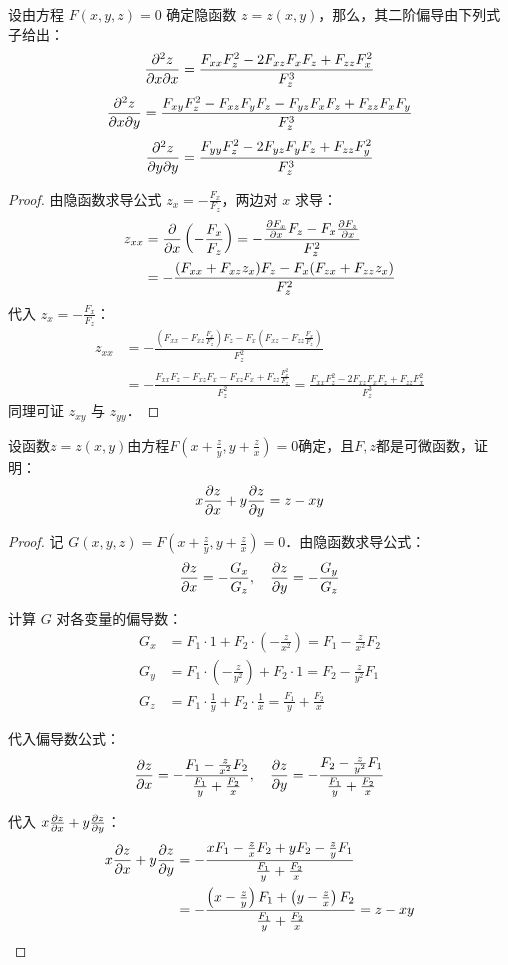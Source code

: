 \documentclass[12pt, a4paper, oneside, UTF8]{ctexbook}
\begin{document}
\begin{theorem}[二元隐函数的二阶导数]
    设由方程 $F(x, y, z) = 0$ 确定隐函数 $z = z(x, y)$，那么，其二阶偏导由下列式子给出：
    \[\pdv{z}{x}{x}=\frac{F_{xx}F_z^2-2F_{xz}F_xF_z+F_{zz}F_x^2}{F_z^3}\]
    \[\pdv{z}{x}{y}=\frac{F_{xy}F_z^2-F_{xz}F_yF_z-F_{yz}F_xF_z+F_{zz}F_xF_y}{F_z^3}\]
    \[\pdv{z}{y}{y}=\frac{F_{yy}F_z^2-2F_{yz}F_yF_z+F_{zz}F_y^2}{F_z^3}\]
\end{theorem}
\begin{proof}
    由隐函数求导公式 $z_x = -\frac{F_x}{F_z}$，两边对 $x$ 求导：
    \begin{align*}
        z_{xx} &= \pdv{x} \left( -\frac{F_x}{F_z} \right) = -\frac{\pdv{F_x}{x} F_z - F_x \pdv{F_z}{x}}{F_z^2} \\
        &= -\frac{(F_{xx} + F_{xz} z_x) F_z - F_x (F_{zx} + F_{zz} z_x)}{F_z^2}
    \end{align*}
    代入 $z_x = -\frac{F_x}{F_z}$：
    \begin{align*}
        z_{xx} &= -\frac{\left( F_{xx} - F_{xz} \frac{F_x}{F_z} \right) F_z - F_x \left( F_{xz} - F_{zz} \frac{F_x}{F_z} \right)}{F_z^2} \\
        &= -\frac{F_{xx} F_z - F_{xz} F_x - F_{xz} F_x + F_{zz} \frac{F_x^2}{F_z}}{F_z^2} = \frac{F_{xx} F_z^2 - 2F_{xz} F_x F_z + F_{zz} F_x^2}{F_z^3}
    \end{align*}
    同理可证 $z_{xy}$ 与 $z_{yy}$．
\end{proof}
\begin{example}
    设函数$z=z(x,y)$由方程$F(x+\frac{z}{y}, y+\frac{z}{x}) = 0$确定，且$F,z$都是可微函数，证明：
    \[ x\pdv{z}{x} + y\pdv{z}{y} = z-xy \]
\end{example}
\begin{proof}
    记 $G(x,y,z) = F(x+\frac{z}{y}, y+\frac{z}{x}) = 0$．由隐函数求导公式：
    \[ \pdv{z}{x} = -\frac{G_x}{G_z}, \quad \pdv{z}{y} = -\frac{G_y}{G_z} \]
    
    计算 $G$ 对各变量的偏导数：
    \begin{align*}
        G_x &= F_1 \cdot 1 + F_2 \cdot \left( -\frac{z}{x^2} \right) = F_1 - \frac{z}{x^2} F_2 \\
        G_y &= F_1 \cdot \left( -\frac{z}{y^2} \right) + F_2 \cdot 1 = F_2 - \frac{z}{y^2} F_1 \\
        G_z &= F_1 \cdot \frac{1}{y} + F_2 \cdot \frac{1}{x} = \frac{F_1}{y} + \frac{F_2}{x}
    \end{align*}

    代入偏导数公式：
    \[ \pdv{z}{x} = -\frac{F_1 - \frac{z}{x^2} F_2}{\frac{F_1}{y} + \frac{F_2}{x}}, \quad \pdv{z}{y} = -\frac{F_2 - \frac{z}{y^2} F_1}{\frac{F_1}{y} + \frac{F_2}{x}} \]

    代入 $x\pdv{z}{x} + y\pdv{z}{y}$：
    \begin{align*}
        x\pdv{z}{x} + y\pdv{z}{y} &= -\frac{xF_1 - \frac{z}{x} F_2 + yF_2 - \frac{z}{y} F_1}{\frac{F_1}{y} + \frac{F_2}{x}} \\
        &= -\frac{\left( x - \frac{z}{y} \right) F_1 + \left( y - \frac{z}{x} \right) F_2}{\frac{F_1}{y} + \frac{F_2}{x}} = z - xy
    \end{align*}
\end{proof}
\end{document}

